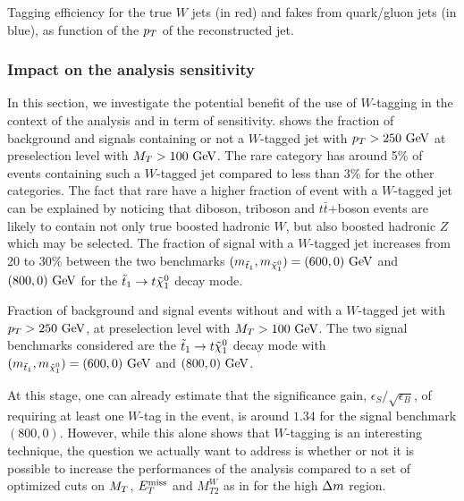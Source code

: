                  {Tagging efficiency for the true $W$ jets (in red) and fakes from quark/gluon
                 jets (in blue), as function of the $p_T$ of the reconstructed jet.}

    \subsubsection{Impact on the analysis sensitivity}

    In this section, we investigate the potential benefit of the use of $W$-tagging
    in the context of the analysis and in term of sensitivity. 
    shows the fraction of background and signals containing or not a $W$-tagged jet
    with $p_T > 250~\text{GeV}$ at preselection level with $M_T > 100~\text{GeV}$. The
    rare category has around 5\% of events containing such a $W$-tagged jet compared
    to less than 3\% for the other categories. The fact that rare have a higher
    fraction of event with a $W$-tagged jet can be explained by noticing that
    diboson, triboson and $t\bar{t}$+boson events are likely to contain not only
    true boosted hadronic $W$, but also boosted hadronic $Z$ which may be selected.
    The fraction of signal with a $W$-tagged jet increases from 20 to 30\% between
    the two benchmarks $(m_{\tilde{t}_1},m_{\tilde{\chi}_1^0}) = (600,0) ~\text{GeV}$ and
    $(800,0) ~\text{GeV}$ for the $\tilde{t}_1 \rightarrow t \tilde{\chi}_1^0$ decay mode.

                 {Fraction of background and signal events without and with a
                 $W$-tagged jet with $p_T > 250~\text{GeV}$, at preselection level with
                 $M_T > 100~\text{GeV}$. The two signal benchmarks considered are the $\tilde{t}_1
                 \rightarrow t \tilde{\chi}_1^0$ decay mode with
                 $(m_{\tilde{t}_1},m_{\tilde{\chi}_1^0}) = (600,0)~\text{GeV}$ and $(800,0)~\text{GeV}$.}

    At this stage, one can already estimate that the significance gain, $\epsilon_S / \sqrt{\epsilon_B}$,
    of requiring at least one $W$-tag in the event, is around $1.34$ for the
    signal benchmark $(800,0)$. However, while this alone shows that $W$-tagging
    is an interesting technique, the question we actually want to address is whether or not
    it is possible to increase the performances of the analysis compared to a set
    of optimized cuts on $M_T$, $E_T^\text{miss}$ and $M_{T2}^{W}$ as in
     for the high $\Delta m$ region.


